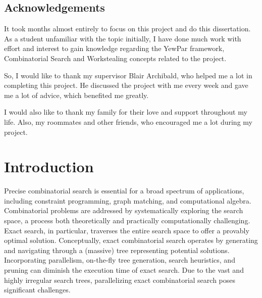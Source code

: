 \documentclass{mproj}
\begin{document}

\educationalconsent



\newpage
\section*{Acknowledgements}

It took months almost entirely to focus on this project and do this dissertation.
As a student unfamiliar with the topic initially,
I have done much work with effort and interest to gain knowledge regarding the YewPar framework,
Combinatorial Search and Workstealing concepts related to the project.

So, I would like to thank my supervisor Blair Archibald, who helped me a lot in completing this project.
He discussed the project with me every week and gave me a lot of advice, which benefited me
greatly.

I would also like to thank my family for their love and support throughout my life. Also, my
roommates and other friends, who encouraged me a lot during my project.

\tableofcontents

\chapter{Introduction}\label{intro}

Precise combinatorial search is essential for a broad spectrum of applications,
including constraint programming, graph matching, and computational algebra.
Combinatorial problems are addressed by systematically exploring the search space,
a process both theoretically and practically computationally challenging.
Exact search, in particular, traverses the entire search space to offer a provably optimal solution.
Conceptually, exact combinatorial search operates by generating and navigating through a (massive) tree representing potential solutions.
Incorporating parallelism, on-the-fly tree generation, search heuristics, and pruning can diminish the execution time of exact search.
Due to the vast and highly irregular search trees, parallelizing exact combinatorial search poses significant challenges.
\end{document}
